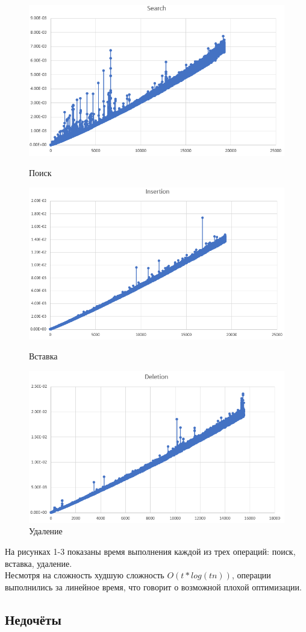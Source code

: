 \documentclass[12pt]{article}
\begin{document}
\begin{figure}[htp]

\centering
\includegraphics[width=.7\textwidth]{pics/Search.PNG}\hfill
\caption{Поиск}
\includegraphics[width=.7\textwidth]{pics/Insertion.PNG}\hfill
\caption{Вставка}
\includegraphics[width=.7\textwidth]{pics/Deletion.PNG}
\caption{Удаление}
\label{fig:figure3}

\end{figure}

На рисунках 1-3 показаны время выполнения каждой из трех операций: поиск, вставка, удаление.\\
Несмотря на сложность худшую сложность $O(t*log(tn))$, операции выполнились за линейное время, что говорит о возможной плохой оптимизации.

\linebreak

\subsection*{Недочёты}
\end{document}
